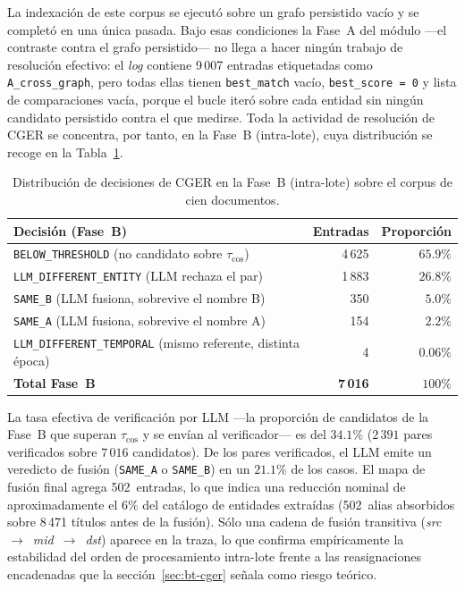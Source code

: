 La indexación de este corpus se ejecutó sobre un grafo persistido vacío y se completó en una única pasada. Bajo esas condiciones la Fase~A del módulo ---el contraste contra el grafo persistido--- no llega a hacer ningún trabajo de resolución efectivo: el \emph{log} contiene 9\,007 entradas etiquetadas como \texttt{A\_cross\_graph}, pero todas ellas tienen \texttt{best\_match} vacío, \texttt{best\_score~=~0} y lista de comparaciones vacía, porque el bucle iteró sobre cada entidad sin ningún candidato persistido contra el que medirse. Toda la actividad de resolución de CGER se concentra, por tanto, en la Fase~B (intra-lote), cuya distribución se recoge en la Tabla~\ref{tab:eval-ragtest-cger-decisions}.

\begin{table}[h]
\centering
\small
\begin{tabular}{lrr}
\hline
\textbf{Decisión (Fase~B)} & \textbf{Entradas} & \textbf{Proporción} \\ \hline
\texttt{BELOW\_THRESHOLD} (no candidato sobre $\tau_{\cos}$) & 4\,625 & $65.9\%$ \\
\texttt{LLM\_DIFFERENT\_ENTITY} (LLM rechaza el par)   & 1\,883 & $26.8\%$ \\
\texttt{SAME\_B} (LLM fusiona, sobrevive el nombre B)  &   350 &  $5.0\%$ \\
\texttt{SAME\_A} (LLM fusiona, sobrevive el nombre A)  &   154 &  $2.2\%$ \\
\texttt{LLM\_DIFFERENT\_TEMPORAL} (mismo referente, distinta época) & 4 & $0.06\%$ \\ \hline
\textbf{Total Fase~B} & \textbf{7\,016} & \textbf{$100\%$} \\ \hline
\end{tabular}
\caption{Distribución de decisiones de CGER en la Fase~B (intra-lote) sobre el corpus de cien documentos.}
\label{tab:eval-ragtest-cger-decisions}
\end{table}

La tasa efectiva de verificación por LLM ---la proporción de candidatos de la Fase~B que superan $\tau_{\cos}$ y se envían al verificador--- es del $34.1\%$ ($2\,391$ pares verificados sobre $7\,016$ candidatos). De los pares verificados, el LLM emite un veredicto de fusión (\texttt{SAME\_A} o \texttt{SAME\_B}) en un $21.1\%$ de los casos. El mapa de fusión final agrega 502~entradas, lo que indica una reducción nominal de aproximadamente el $6\%$ del catálogo de entidades extraídas (502~alias absorbidos sobre 8\,471 títulos antes de la fusión). Sólo una cadena de fusión transitiva (\emph{src}~$\to$~\emph{mid}~$\to$~\emph{dst}) aparece en la traza, lo que confirma empíricamente la estabilidad del orden de procesamiento intra-lote frente a las reasignaciones encadenadas que la sección~\ref{sec:bt-cger} señala como riesgo teórico.

